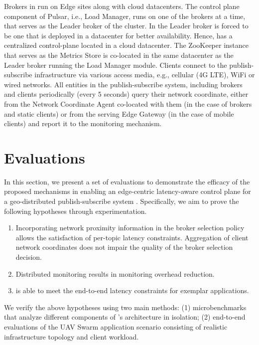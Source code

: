 \par Brokers in \epulsar{} run on Edge sites along with cloud datacenters. The control plane component of Pulsar, i.e., Load Manager, runs on one of the brokers at a time, that serves as the Leader broker of the cluster. In \epulsar{} the Leader broker is forced to be one that is deployed in a datacenter for better availability. Hence, \epulsar{} has a centralized control-plane located in a cloud datacenter. The ZooKeeper instance that serves as the Metrics Store is co-located in the same datacenter as the Leader broker running the Load Manager module. Clients connect to the publish-subscribe infrastructure via various access media, e.g., cellular (4G LTE), WiFi or wired networks. All entities in the publish-subscribe system, including brokers and clients periodically (every 5 seconds) query their network coordinate, either from the Network Coordinate Agent co-located with them (in the case of brokers and static clients) or from the serving Edge Gateway (in the case of mobile clients) and report it to the monitoring mechanism.

\section{Evaluations}
\label{sec:epulsar_evals}
In this section, we present a set of evaluations to demonstrate the efficacy of the proposed mechanisms in enabling an edge-centric latency-aware control plane for a geo-distributed publish-subscribe system \epulsar{}. Specifically, we aim to prove the following hypotheses through experimentation.
\begin{enumerate}
\item Incorporating network proximity information in the broker selection policy allows the satisfaction of per-topic latency constraints. Aggregation of client network coordinates does not impair the quality of the broker selection decision.
\item Distributed monitoring results in monitoring overhead reduction.
\item \epulsar{} is able to meet the end-to-end latency constraints for exemplar applications.
\end{enumerate}
We verify the above hypotheses using two main methods: (1) microbenchmarks that analyze different components of \epulsar's architecture in isolation; (2) end-to-end evaluations of the UAV Swarm application scenario consisting of realistic infrastructure topology and client workload.

